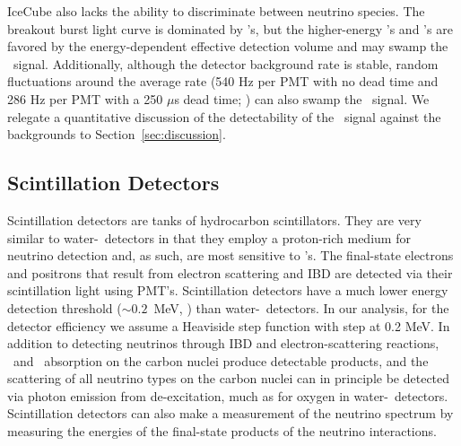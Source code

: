 IceCube also lacks the ability to discriminate between neutrino species.  The 
    breakout burst light curve is dominated by \nue's, but the higher-energy 
    \anue's and \nux's are favored by the energy-dependent effective detection 
    volume and may swamp the \nue\ signal.  Additionally, although the detector 
    background rate is stable, random fluctuations around the average rate (540 Hz 
    per PMT with no dead time and 286 Hz per PMT 
    with a 250 $\mu$s dead time; \citealt{abbasietal2011}) can also swamp the 
    \nue\ signal.  We relegate a quantitative discussion of the detectability of 
    the \nue\ signal against the backgrounds to Section~\ref{sec:discussion}.


\subsection{Scintillation Detectors}
Scintillation detectors are tanks of hydrocarbon 
scintillators.  They are very similar to water-\cer\
detectors in that 
they employ a proton-rich medium for neutrino detection 
and, as such, are most sensitive  to
\anue's. The final-state electrons and positrons that result from
electron scattering and IBD are detected via their scintillation light
using PMT's. 
 Scintillation detectors have a much lower energy detection threshold  
(${\sim}0.2$~MeV, \citealt{lahaetal2014}) than
 water-\cer\ detectors.  In our analysis, 
for the detector efficiency we assume a Heaviside step function 
with step at 0.2 MeV. In addition to detecting
neutrinos through IBD and electron-scattering reactions, \nue\
and \anue\ absorption on the carbon nuclei produce detectable
products, and the scattering
of all neutrino types on the carbon nuclei can 
in principle  be detected via photon
emission from de-excitation, much as for oxygen in water-\cer\
detectors.  Scintillation detectors can also make a measurement of the
neutrino spectrum by measuring the energies of the final-state
products of the neutrino interactions.

